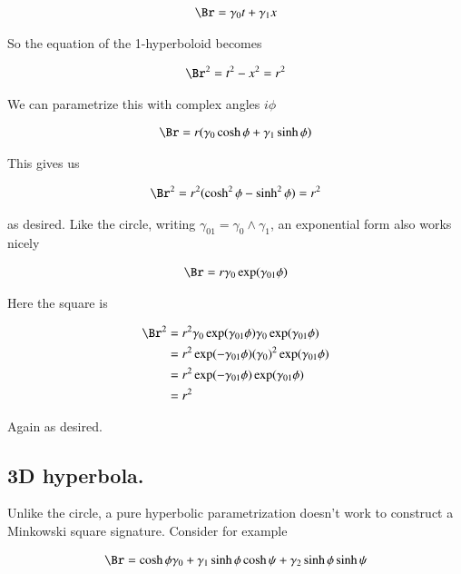 \begin{align*}
\Br = \gamma_0 t + \gamma_1 x
\end{align*}

So the equation of the 1-hyperboloid becomes

\begin{align*}
\Br^2 = t^2 - x^2 = r^2
\end{align*}

We can parametrize this with complex angles $i\phi$

\begin{align*}
\Br = r (\gamma_0 \cosh\phi + \gamma_1 \sinh\phi) 
\end{align*}

This gives us

\begin{align*}
\Br^2 = r^2 (\cosh^2\phi - \sinh^2\phi) = r^2
\end{align*}

as desired.  Like the circle, writing $\gamma_{01} = \gamma_0 \wedge \gamma_1$, an exponential form also works nicely

\begin{align*}
\Br = r \gamma_0 \exp(\gamma_{01} \phi)
\end{align*}

Here the square is 

\begin{align*}
\Br^2 
&= r^2 \gamma_0 \exp(\gamma_{01} \phi) \gamma_0 \exp(\gamma_{01} \phi) \\
&= r^2 \exp(-\gamma_{01} \phi) (\gamma_0)^2 \exp(\gamma_{01} \phi) \\
&= r^2 \exp(-\gamma_{01} \phi) \exp(\gamma_{01} \phi) \\
&= r^2 \\
\end{align*}

Again as desired.

\subsection{3D hyperbola. }

Unlike the circle, a pure hyperbolic parametrization doesn't work to construct a Minkowski
square signature.  Consider for example

\begin{align*}
\Br 
&= \cosh \phi \gamma_0 + \gamma_1 \sinh\phi \cosh \psi + \gamma_2 \sinh\phi \sinh\psi \\
\end{align*}

